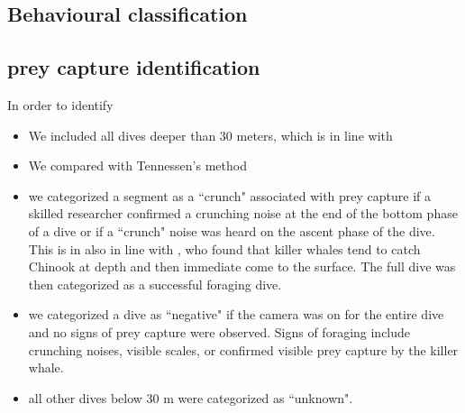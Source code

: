 
\subsection{Behavioural classification}


\subsection{prey capture identification}

In order to identify 

\begin{itemize}
    \item We included all dives deeper than 30 meters, which is in line with \citet{Wright:2017}
    \item We compared with Tennessen's method
    \item we categorized a segment as a ``crunch" associated with prey capture if a skilled researcher confirmed a crunching noise at the end of the bottom phase of a dive or if a ``crunch" noise was heard on the ascent phase of the dive. This is in also in line with \citet{Wright:2017}, who found that killer whales tend to catch Chinook at depth and then immediate come to the surface. The full dive was then categorized as a successful foraging dive.
    \item we categorized a dive as ``negative" if the camera was on for the entire dive and no signs of prey capture were observed. Signs of foraging include crunching noises, visible scales, or confirmed visible prey capture by the killer whale.
    \item all other dives below 30 m were categorized as ``unknown".
\end{itemize}